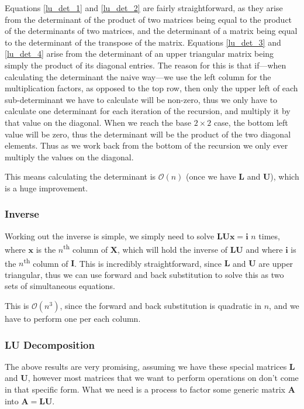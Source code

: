 \documentclass[12pt]{article}
\begin{document}
Equations \ref{lu_det_1} and \ref{lu_det_2} are fairly straightforward, as they arise from the determinant of the product of two matrices being equal to the product of the determinants of two matrices, and the determinant of a matrix being equal to the determinant of the transpose of the matrix. Equations \ref{lu_det_3} and \ref{lu_det_4}
arise from the determinant of an upper triangular matrix being simply the product of its diagonal entries. The reason for this is that if---when calculating the determinant the naive way---we use the left column for the multiplication factors, as opposed to the top row, then only the upper left of each sub-determinant we have to calculate will be non-zero, thus we only have to calculate one determinant for each iteration of the recursion, and multiply it by that value on the diagonal. When we reach the base $2\times2$ case, the bottom left value will be zero, thus the determinant will be the product of the two diagonal elements. Thus as we work back from the bottom of the recursion we only ever multiply the values on the diagonal.

This means calculating the determinant is $\mathcal{O}(n)$ (once we have $\mathbf{L}$ and $\mathbf{U}$), which is a huge improvement.

\subsubsection{Inverse}
Working out the inverse is simple, we simply need to solve $\mathbf{LUx}=\mathbf{i}$ $n$ times, where $\mathbf{x}$ is the $n$\textsuperscript{th} column of $\mathbf{X}$, which will hold the inverse of $\mathbf{LU}$ and where $\mathbf{i}$ is the $n$\textsuperscript{th} column of $\mathbf{I}$. This is incredibly straightforward, since $\mathbf{L}$ and $\mathbf{U}$ are upper triangular, thus we can use forward and back substitution to solve this as two sets of simultaneous equations.

This is $\mathcal{O}(n^3)$, since the forward and back substitution is quadratic in $n$, and we have to perform one per each column.

\subsubsection{LU Decomposition}
The above results are very promising, assuming we have these special matrices $\mathbf{L}$ and $\mathbf{U}$, however most matrices that we want to perform operations on don't come in that specific form. What we need is a process to factor some generic matrix $\mathbf{A}$ into $\mathbf{A}=\mathbf{LU}$.
\end{document}
